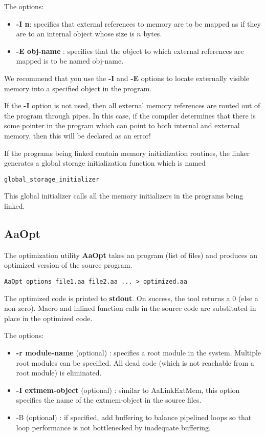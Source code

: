The options:
\begin{itemize}
\item {\bf -I n}: specifies that external references to memory
are to be mapped as if they are to an internal object whose size
is $n$ bytes.
\item {\bf -E obj-name} : specifies that the object to which
external references are mapped is to be named obj-name.
\end{itemize}
We recommend that you use the {\bf -I} and {\bf -E} options to
locate externally visible memory into a specified object in the
\Aa program.   

If the {\bf -I} option is not used, then all external memory
references are routed out of the \Aa program through pipes.
In this case, if the \Aa compiler determines that there is some pointer 
in the program which can point
to both internal and external memory, then this will be
declared as an error!  

If the programs being linked contain memory initialization
routines, the linker generates a global storage initialization
function which is named 
\begin{verbatim}
global_storage_initializer
\end{verbatim}
This global initializer calls all the memory initializers in
the programs being linked.

\subsection{{\bf AaOpt}}

The optimization utility {\bf AaOpt} takes an \Aa program (list of
\Aa files) and produces an optimized version of the source program.
\begin{verbatim}
AaOpt options file1.aa file2.aa ... > optimized.aa
\end{verbatim}
The optimized \Aa code is printed to {\bf stdout}.  On success, 
the tool returns a 0 (else a non-zero).  Macro and inlined
function calls in the source code are substituted in place
in the optimized code.

The options:
\begin{itemize}
\item {\bf -r module-name} (optional) : specifies a root module in the
system.  Multiple root modules can be specified.  All dead code (which
is not reachable from a root module) is eliminated.
\item {\bf -I extmem-object} (optional) : similar to AaLinkExtMem,
this option specifies the name of the extmem-object in the
source \Aa files.
\item {-B} (optional) : if specified, add buffering to balance pipelined
loops so that loop performance is not bottlenecked by inadequate
buffering.
\end{itemize}


